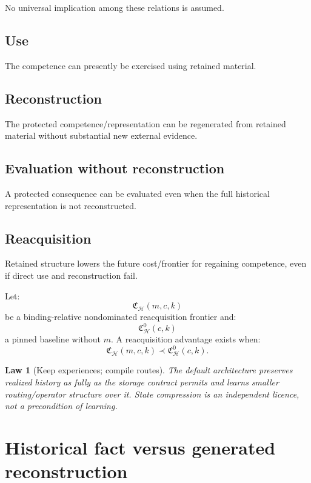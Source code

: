 \documentclass[11pt,oneside]{article}
\newtheorem{law}[definition]{Law}
\begin{document}
No universal implication among these relations is assumed.

\subsection{Use}

The competence can presently be exercised using retained material.

\subsection{Reconstruction}

The protected competence/representation can be regenerated from retained material without substantial new external evidence.

\subsection{Evaluation without reconstruction}

A protected consequence can be evaluated even when the full historical representation is not reconstructed.

\subsection{Reacquisition}

Retained structure lowers the future cost/frontier for regaining competence, even if direct use and reconstruction fail.

Let:
\[
\mathfrak C_{\mathcal H}(m,c,k)
\]
be a binding-relative nondominated reacquisition frontier and:
\[
\mathfrak C^0_{\mathcal H}(c,k)
\]
a pinned baseline without \(m\).  A reacquisition advantage exists when:
\[
\boxed{
\mathfrak C_{\mathcal H}(m,c,k)
\prec
\mathfrak C^0_{\mathcal H}(c,k).
}
\]

\begin{law}[Keep experiences; compile routes]
The default architecture preserves realized history as fully as the storage contract permits and learns smaller routing/operator structure over it.  State compression is an independent licence, not a precondition of learning.
\end{law}

\section{Historical fact versus generated reconstruction}
\end{document}

